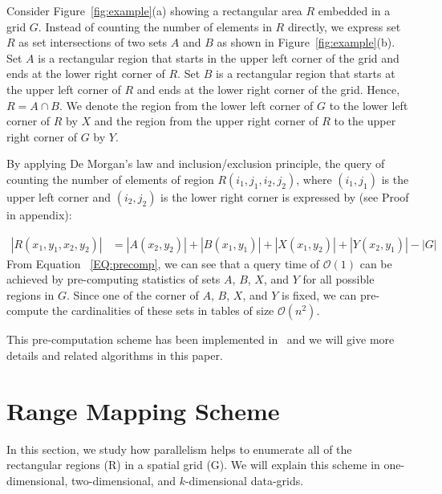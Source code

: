 \documentclass[AMA,LATO1COL]{WileyNJD-v2}
\newcommand\bigo{\mathcal O}
\begin{document}
Consider Figure~\ref{fig:example}(a) showing a rectangular area $R$ embedded in a grid $G$. Instead of counting the number of elements in $R$ directly, we express set $R$ as set intersections of two sets $A$ and $B$ as shown in Figure~\ref{fig:example}(b). Set $A$ is a rectangular region that starts in the upper left corner of the grid and ends at the lower right corner of $R$. Set $B$ is a rectangular region that starts at the upper left corner of $R$ and ends at the lower right corner of the grid. Hence, $R=A \cap B$. We denote the region from the lower left corner of $G$ to the lower left corner of $R$ by $X$ and the region from the upper right corner of $R$ to the upper right corner of $G$ by $Y$.

 By applying De Morgan's law and inclusion/exclusion principle, the query of counting the number of elements of region $R(i_1,j_1,i_2,j_2)$, where $(i_1,j_1)$ is the upper left corner and $(i_2,j_2)$ is the lower right corner is expressed by (see Proof in appendix):


\begin{equation}
\label{EQ:precomp}
\begin{split}
|R(x_1,y_1,x_2,y_2)|& = |A(x_2,y_2)| + |B(x_1,y_1)| + |X(x_1,y_2)|  + |Y(x_2,y_1)| - |G|
\end{split}
\end{equation}
\normalsize
From Equation ~\ref{EQ:precomp}, we can see that a query time of $\bigo(1)$ can be achieved by pre-computing statistics of sets $A$, $B$, $X$, and $Y$ for all possible regions in $G$. Since one of the corner of $A$, $B$, $X$, and $Y$ is fixed, we can pre-compute the cardinalities of these sets in tables of size $\bigo(n^2)$.

This pre-computation scheme has been implemented in~\cite{apweb} and we will give more details and related algorithms in this paper.

\section {Range Mapping Scheme} \label{RMS}
In this section, we study how parallelism helps to enumerate all of the rectangular regions (R) in a spatial grid (G). We will explain this scheme in one-dimensional, two-dimensional, and $k$-dimensional data-grids.
\end{document}
